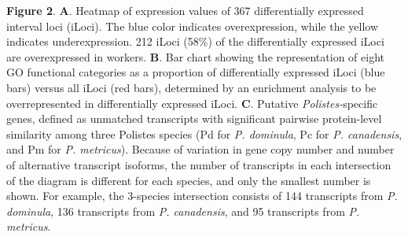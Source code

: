 \documentclass[]{article}
\begin{document}
\textbf{Figure 2}. \textbf{A}. Heatmap of expression values of 367
differentially expressed interval loci (iLoci). The blue color indicates
overexpression, while the yellow indicates underexpression. 212 iLoci
(58\%) of the differentially expressed iLoci are overexpressed in
workers. \textbf{B}. Bar chart showing the representation of eight GO
functional categories as a proportion of differentially expressed iLoci
(blue bars) versus all iLoci (red bars), determined by an enrichment
analysis to be overrepresented in differentially expressed iLoci.
\textbf{C}. Putative \emph{Polistes-}specific genes, defined as
unmatched transcripts with significant pairwise protein-level similarity
among three Polistes species (Pd for \emph{P. dominula}, Pc for \emph{P.
canadensis}, and Pm for \emph{P. metricus}). Because of variation in
gene copy number and number of alternative transcript isoforms, the
number of transcripts in each intersection of the diagram is different
for each species, and only the smallest number is shown. For example,
the 3-species intersection consists of 144 transcripts from \emph{P.
dominula}, 136 transcripts from \emph{P. canadensis}, and 95 transcripts
from \emph{P. metricus}.
\end{document}

